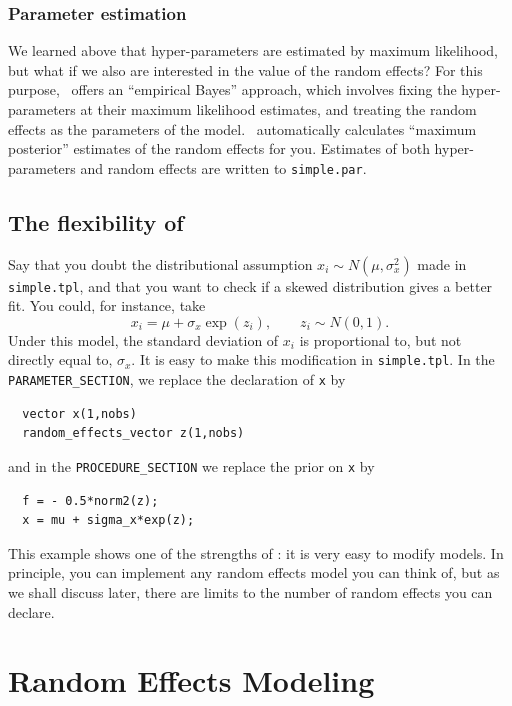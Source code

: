 \documentclass{admbmanual}
\begin{document}
\subsection{Parameter estimation}

We learned above that hyper-parameters are estimated by maximum likelihood, but
what if we also are interested in the value of the random effects? For this
purpose, \scAR\ offers an ``empirical Bayes'' approach, which involves fixing
the hyper-parameters at their maximum likelihood estimates, and treating the
random effects as the parameters of the model. \scAR\ automatically calculates
``maximum posterior'' estimates of the random effects for you. Estimates of both
hyper-parameters and random effects are written to \texttt{simple.par}.

\section{The flexibility of \scAR\label{lognormal}}

Say that you doubt the distributional assumption $x_i\sim N(\mu,\sigma_x^2)$
made in \texttt{simple.tpl}, and that you want to check if a skewed
distribution gives a better fit. You could, for instance, take
\[
x_i=\mu +\sigma_x\exp (z_i),\qquad z_i\sim N(0,1).
\]
Under this model, the standard deviation of $x_i$ is proportional to, but not
directly equal to, $\sigma_x$. It is easy to make this modification in
\texttt{simple.tpl}. In the \texttt{PARAMETER\_SECTION}, we replace the
declaration of \texttt{x} by
\begin{lstlisting}
  vector x(1,nobs)
  random_effects_vector z(1,nobs)
\end{lstlisting}
and in the \texttt{PROCEDURE\_SECTION} we replace the prior on \texttt{x} by
\begin{lstlisting}
  f = - 0.5*norm2(z);
  x = mu + sigma_x*exp(z);
\end{lstlisting}

This example shows one of the strengths of \scAR: it is very easy to modify
models. In principle, you can implement any random effects model you can think
of, but as we shall discuss later, there are limits to the number of random
effects you can declare.

\chapter{Random Effects Modeling}
\label{ch:random-effects-modeling}
\end{document}
